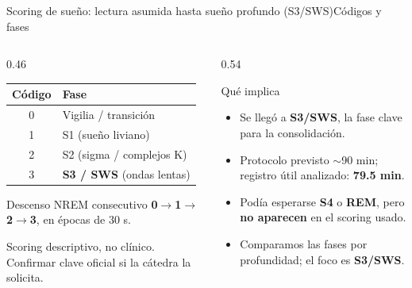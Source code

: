 \documentclass[aspectratio=169,11pt,t]{beamer}
\begin{document}
\begin{frame}{Scoring de sueño: lectura asumida hasta sueño profundo (S3/SWS)}{Códigos y fases}
  \begin{columns}[T,onlytextwidth]
    \begin{column}{0.46\textwidth}
      \footnotesize
      \begin{tabular}{cl}
        \toprule
        Código & Fase\\
        \midrule
        0 & Vigilia / transición\\
        1 & S1 (sueño liviano)\\
        2 & S2 (sigma / complejos K)\\
        3 & \textbf{S3 / SWS} (ondas lentas)\\
        \bottomrule
      \end{tabular}
      \vskip6pt
      \normalsize Descenso NREM consecutivo \textbf{0$\to$1$\to$2$\to$3}, en épocas de 30 s.
      \vskip4pt
      \begin{minipage}{0.95\linewidth}
        {\scriptsize\color{muted} Scoring descriptivo, no clínico. Confirmar clave oficial si la cátedra la solicita.}
      \end{minipage}
    \end{column}
    \begin{column}{0.54\textwidth}
      \begin{block}{Qué implica}
        \begin{itemize}\setlength\itemsep{2pt}
          \item Se llegó a \textbf{S3/SWS}, la fase clave para la consolidación.
          \item Protocolo previsto $\sim$90 min; registro útil analizado: \textbf{79.5 min}.
          \item Podía esperarse \textbf{S4} o \textbf{REM}, pero \textbf{no aparecen} en el scoring usado.
          \item Comparamos las fases por profundidad; el foco es \textbf{S3/SWS}.
        \end{itemize}
      \end{block}
    \end{column}
  \end{columns}
\end{frame}
\end{document}
